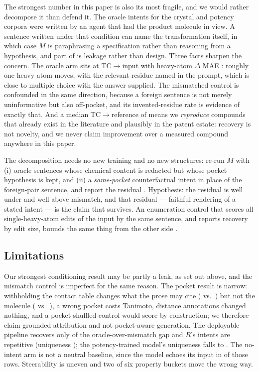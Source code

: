 The strongest number in this paper is also its most fragile, and we would rather decompose it than
defend it. The oracle intents for the crystal and potency corpora were written by an agent that had
the product molecule in view. A sentence written under that condition can name the transformation
itself, in which case $M$ is paraphrasing a specification rather than reasoning from a hypothesis,
and part of  is leakage rather than design. Three facts sharpen the concern. The oracle arm
sits at TC$\rightarrow$input  with heavy-atom $\Delta$ MAE : roughly one heavy atom
moves, with the relevant residue named in the prompt, which is close to multiple choice with the
answer supplied. The mismatched control is confounded in the same direction, because a foreign
sentence is not merely uninformative but also off-pocket, and its  invented-residue rate is
evidence of exactly that. And a median TC$\rightarrow$reference of  means we \emph{reproduce}
compounds that already exist in the literature and plausibly in the patent estate: recovery is not
novelty, and we never claim improvement over a measured compound anywhere in this paper.

The decomposition needs no new training and no new structures: re-run $M$ with (i) oracle sentences
whose chemical content is redacted but whose pocket hypothesis is kept, and (ii) a \emph{same-pocket}
counterfactual intent in place of the foreign-pair sentence, and report the residual
. Hypothesis: the residual is well under  and well above
mismatch, and that residual --- faithful rendering of a stated intent --- is the claim that survives.
An enumeration control that scores all single-heavy-atom edits of the input by the same sentence, and
reports recovery by edit size, bounds the same thing from the other side
.

\subsection{Limitations}

Our strongest conditioning result may be partly a leak, as set out above, and the mismatch control is
imperfect for the same reason. The pocket result is narrow: withholding the contact table changes
what the prose may cite ( vs.\ ) but not the molecule ( vs.\ ), a
wrong pocket costs  Tanimoto, distance annotations changed nothing, and a pocket-shuffled
control would score  by construction; we therefore claim grounded attribution and not
pocket-aware generation. The deployable pipeline recovers only  of the oracle-over-mismatch
gap and $R$'s intents are repetitive (uniqueness ); the potency-trained model's uniqueness
falls to . The no-intent arm is not a neutral baseline, since the model echoes its input in
 of those rows. Steerability is uneven and two of six property buckets move the wrong way.

